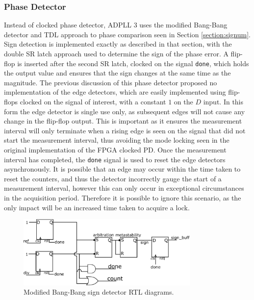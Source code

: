 \subsubsection{Phase Detector}
Instead of  clocked phase detector, \ac{ADPLL} 3 uses the modified Bang-Bang detector and \ac{TDL} approach to phase comparison seen in Section \ref{section:signum}. Sign detection is implemented exactly as described in that section, with the double \ac{SR} latch approach used to determine the sign of the phase error. A flip-flop is inserted after the second \ac{SR} latch, clocked on the signal \texttt{done}, which holds the output value and ensures that the sign changes at the same time as the magnitude. The previous discussion of this phase detector proposed no implementation of the edge detectors, which are easily implemented using flip-flops clocked on the signal of interest, with a constant $1$ on the $D$ input. In this form the edge detector is single use only, as subsequent edges will not cause any change in the flip-flop output. This is important as it ensures the measurement interval will only terminate when a rising edge is seen on the signal that did not start the measurement interval, thus avoiding the mode locking seen in the original implementation of the \ac{FPGA} clocked \ac{PD}. Once the measurement interval has completed, the \texttt{done} signal is used to reset the edge detectors asynchronously. It is possible that an edge may occur within the time taken to reset the counters, and thus the detector incorrectly gauge the start of a measurement interval, however this can only occur in exceptional circumstances in the acquisition period. Therefore it is possible to ignore this scenario, as the only impact will be an increased time taken to acquire a lock.
\begin{figure}[h]
    \centering
    \includegraphics[width=0.8\textwidth]{../new_pdet1}
    \caption[Modified Bang-Bang sign detector RTL diagrams]{Modified Bang-Bang sign detector RTL diagrams.}
    \label{fig:signdet_impl}
\end{figure}

